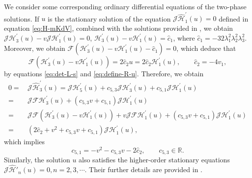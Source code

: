 \documentclass[11pt,reqno]{amsart}
\numberwithin{equation}{section}
\begin{document}
We consider some corresponding ordinary differential equations of the two-phase solutions.
If $u$ is the stationary solution of the equation $\mathcal{J}\hat{\mathcal{H}}_1^{\prime}(u)=0$ defined in equation \eqref{eq:H-mKdV}, combined with the solutions provided in , we obtain 
$\mathcal{JH}^{\prime}_3(u)-v\mathcal{JH}^{\prime}_1(u)=0$, $\mathcal{H}^{\prime}_3(u)-v\mathcal{H}^{\prime}_1(u)=\hat{c}_1$, 
where $\hat{c}_1=-32\lambda_1^2\lambda_2^2\lambda_3^2$.
Moreover, we obtain 
$\mathcal{F}(\mathcal{H}^{\prime}_3(u)-v\mathcal{H}^{\prime}_1(u)-\hat{c}_1)=0$, which deduce that
\begin{equation}\label{eq:hat-c}
	\mathcal{F}(\mathcal{H}^{\prime}_3(u)-v\mathcal{H}^{\prime}_1(u))=2\hat{c}_2u=2\hat{c}_2\mathcal{H}^{\prime}_1(u), \qquad \hat{c}_2=-4v_1,
\end{equation}
 by equations \eqref{eq:det-L-s} and \eqref{eq:define-R-u}.
Therefore, we obtain 
\begin{equation}\nonumber
	\begin{split}
		0=&\, \mathcal{J}\hat{\mathcal{H}}_3^{\prime}(u)=\mathcal{JH}_5^{\prime}(u)+c_{5,3}\mathcal{JH}_3^{\prime}(u)+c_{5,1}\mathcal{JH}_1^{\prime}(u)\\
		=&\, \mathcal{JFH}_3^{\prime}(u)+(c_{5,3}v+c_{5,1})\mathcal{JH}_1^{\prime}(u)\\
		=&\, \mathcal{JF}(\mathcal{H}_3^{\prime}(u)-v\mathcal{H}_1^{\prime}(u))+v\mathcal{JFH}_1^{\prime}(u)+(c_{5,3}v+c_{5,1})\mathcal{JH}_1^{\prime}(u)\\
		=&\, (2\hat{c}_2+v^2+c_{5,3}v+c_{5,1})\mathcal{JH}_1^{\prime}(u),
	\end{split}
\end{equation}
 which implies 
\begin{equation}\label{eq:c1c2}
	c_{5,1}=-v^2-c_{5,3}v-2\hat{c}_2, \qquad c_{5,3}\in \mathbb{R}.
\end{equation}
Similarly, the solution $u$ also satisfies the higher-order stationary equations $\mathcal{J}\hat{\mathcal{H}}'_n(u)=0, n=2,3,\cdots$. Their further details are provided in \cite{LingS-23-mKdV-stability}.
\end{document}
